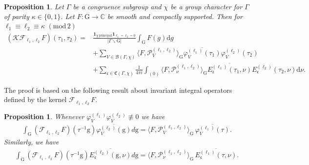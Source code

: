 \documentclass[12pt]{amsart}
\newtheorem{proposition}[theorem]{Proposition}
\theoremstyle{definition}
\theoremstyle{remark}
\numberwithin{equation}{section}
\newcommand{\G}{\mathrm{G}}
\newcommand{\C}{{\mathbb C}}
\newcommand{\1}{{\mathbf 1}}
\newcommand{\g}{\mathrm{g}}
\renewcommand{\d}{\mathrm d}
\renewcommand{\pmod}[1]{\,\,(\mathrm{mod}\,{#1})}
\begin{document}
\begin{proposition} \label{prop:kernelexpansion}
Let $\Gamma$ be a congruence subgroup and $\chi$ be a group character for $\Gamma$ of parity $\kappa \in \{0,1\}$.    Let $F:\G \to \C$ be smooth and compactly supported. Then for $\ell_1\equiv \ell_2 \equiv \kappa \pmod{2}$
    \begin{align*}
 (\mathcal{K} \mathcal{F}_{\ell_1,\ell_2}F)(\tau_1,\tau_2) =&  \frac{\mathbf{1}_{\chi \,\mathrm{principal}} \mathbf{1}_{\ell_1=\ell_2=0}}{|\Gamma \backslash \G|} \int_\G F(g) \d g \\&+ \sum_{V\in \mathcal{B}(\Gamma,\chi)} \langle F, \mathcal{P}^{(\ell_1,\ell_2)}_{V}\rangle_{\G} \overline{\varphi_V^{(\ell_1)}(\tau_1)}\varphi_V^{(\ell_2)}(\tau_2) \\
 &+\sum_{\mathfrak{c}\in \mathfrak{C}(\Gamma,\chi)} \frac{1}{4 \pi i}  \int_{(0)} \langle F, \mathcal{P}^{(\ell_1,\ell_2)}_{\nu}\rangle_{\G} \overline{E^{(\ell_1)}_{\mathfrak{c}}(\tau_1,\nu)}E^{(\ell_2)}_{\mathfrak{c}}(\tau_2,\nu) \d \nu.
    \end{align*}
\end{proposition}
The proof is based on the following result about invariant integral operators defined by the kernel $\mathcal{F}_{\ell_1,\ell_2} F$. 


\begin{proposition} \label{prop:kerneleigen}
 Whenever $\varphi^{(\ell_1)}_V \varphi_V^{(\ell_2)} \not \equiv 0$  we have
 \begin{align*}
     \int_{\G} (\mathcal{F}_{\ell_1,\ell_2} F) (\tau^{-1} \g) \overline{\varphi_{V}^{(\ell_2)}(\g)} d \g  =  \langle F, \mathcal{P}^{(\ell_1,\ell_2)}_{V}\rangle_\G \, \overline{\varphi_{V}^{(\ell_1)}(\tau)}.
 \end{align*} 
Similarly, we have
  \begin{align*}
     \int_{\G} (\mathcal{F}_{\ell_1,\ell_2} F) (\tau^{-1} \g) \overline{E^{(\ell_2)}_{\mathfrak{c}}(\g,\nu) } d \g  =  \langle F, \mathcal{P}^{(\ell_1,\ell_2)}_{\nu}\rangle_\G \, \overline{E^{(\ell_1)}_{\mathfrak{c}}(\tau,\nu) }.
 \end{align*} 
\end{proposition}
\end{document}
